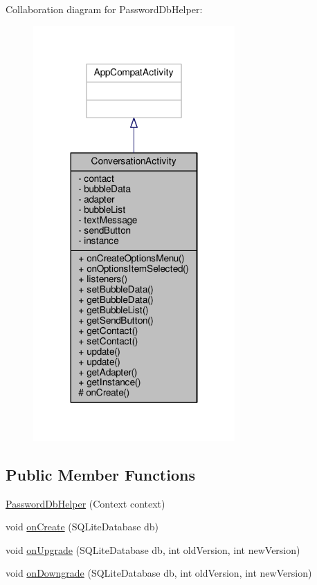 Collaboration diagram for Password\+Db\+Helper\+:
\nopagebreak
\begin{figure}[H]
\begin{center}
\leavevmode
\includegraphics[width=218pt]{a00074}
\end{center}
\end{figure}
\subsection*{Public Member Functions}
\begin{DoxyCompactItemize}
\item 
\hyperlink{a00012_a5253eee04657df75063746388f018998}{Password\+Db\+Helper} (Context context)
\item 
void \hyperlink{a00012_a98b247cd7e075d076b0364beee305621}{on\+Create} (S\+Q\+Lite\+Database db)
\item 
void \hyperlink{a00012_a47418a2bb9896d8cd648b4094755e6c7}{on\+Upgrade} (S\+Q\+Lite\+Database db, int old\+Version, int new\+Version)
\item 
void \hyperlink{a00012_a5a7757b503ddeb122c4633bcd98d70f0}{on\+Downgrade} (S\+Q\+Lite\+Database db, int old\+Version, int new\+Version)
\end{DoxyCompactItemize}
